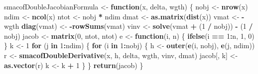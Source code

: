 \documentclass[
  12pt,
]{article}
\newenvironment{Shaded}{\begin{snugshade}}{\end{snugshade}}
\newcommand{\ControlFlowTok}[1]{\textcolor[rgb]{0.13,0.29,0.53}{\textbf{#1}}}
\newcommand{\DecValTok}[1]{\textcolor[rgb]{0.00,0.00,0.81}{#1}}
\newcommand{\FunctionTok}[1]{\textcolor[rgb]{0.13,0.29,0.53}{\textbf{#1}}}
\newcommand{\NormalTok}[1]{#1}
\newcommand{\OtherTok}[1]{\textcolor[rgb]{0.56,0.35,0.01}{#1}}
\newcommand{\SpecialCharTok}[1]{\textcolor[rgb]{0.81,0.36,0.00}{\textbf{#1}}}
\begin{document}
\begin{Shaded}
\begin{Highlighting}[]
\NormalTok{smacofDoubleJacobianFormula }\OtherTok{\textless{}{-}} \ControlFlowTok{function}\NormalTok{(x, delta, wgth) \{}
\NormalTok{  nobj }\OtherTok{\textless{}{-}} \FunctionTok{nrow}\NormalTok{(x)}
\NormalTok{  ndim }\OtherTok{\textless{}{-}} \FunctionTok{ncol}\NormalTok{(x)}
\NormalTok{  ntot }\OtherTok{\textless{}{-}}\NormalTok{ nobj }\SpecialCharTok{*}\NormalTok{ ndim}
\NormalTok{  dmat }\OtherTok{\textless{}{-}} \FunctionTok{as.matrix}\NormalTok{(}\FunctionTok{dist}\NormalTok{(x))}
\NormalTok{  vmat }\OtherTok{\textless{}{-}} \SpecialCharTok{{-}}\NormalTok{wgth}
  \FunctionTok{diag}\NormalTok{(vmat) }\OtherTok{\textless{}{-}} \SpecialCharTok{{-}}\FunctionTok{rowSums}\NormalTok{(vmat)}
\NormalTok{  vinv }\OtherTok{\textless{}{-}} \FunctionTok{solve}\NormalTok{(vmat }\SpecialCharTok{+}\NormalTok{ (}\DecValTok{1} \SpecialCharTok{/}\NormalTok{ nobj)) }\SpecialCharTok{{-}}\NormalTok{ (}\DecValTok{1} \SpecialCharTok{/}\NormalTok{ nobj)}
\NormalTok{  jacob }\OtherTok{\textless{}{-}} \FunctionTok{matrix}\NormalTok{(}\DecValTok{0}\NormalTok{, ntot, ntot)}
\NormalTok{  e }\OtherTok{\textless{}{-}} \ControlFlowTok{function}\NormalTok{(i, n) \{}
    \FunctionTok{ifelse}\NormalTok{(i }\SpecialCharTok{==} \DecValTok{1}\SpecialCharTok{:}\NormalTok{n, }\DecValTok{1}\NormalTok{, }\DecValTok{0}\NormalTok{)}
\NormalTok{  \}}
\NormalTok{  k }\OtherTok{\textless{}{-}} \DecValTok{1}
  \ControlFlowTok{for}\NormalTok{ (j }\ControlFlowTok{in} \DecValTok{1}\SpecialCharTok{:}\NormalTok{ndim) \{}
    \ControlFlowTok{for}\NormalTok{ (i }\ControlFlowTok{in} \DecValTok{1}\SpecialCharTok{:}\NormalTok{nobj) \{}
\NormalTok{      h }\OtherTok{\textless{}{-}} \FunctionTok{outer}\NormalTok{(}\FunctionTok{e}\NormalTok{(i, nobj), }\FunctionTok{e}\NormalTok{(j, ndim))}
\NormalTok{      r }\OtherTok{\textless{}{-}} \FunctionTok{smacofDoubleDerivative}\NormalTok{(x, h, delta, wgth, vinv, dmat)}
\NormalTok{      jacob[, k] }\OtherTok{\textless{}{-}} \FunctionTok{as.vector}\NormalTok{(r)}
\NormalTok{      k }\OtherTok{\textless{}{-}}\NormalTok{ k }\SpecialCharTok{+} \DecValTok{1}
\NormalTok{    \}}
\NormalTok{  \}}
  \FunctionTok{return}\NormalTok{(jacob)}
\NormalTok{\}}


\end{Highlighting}
\end{Shaded}
\end{document}
